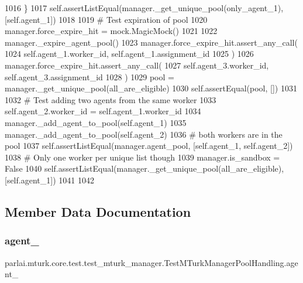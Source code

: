 \begin{DoxyCode}
1016         \}
1017         self.assertListEqual(manager.\_get\_unique\_pool(only\_agent\_1), [self.agent\_1])
1018 
1019         \textcolor{comment}{# Test expiration of pool}
1020         manager.force\_expire\_hit = mock.MagicMock()
1021 
1022         manager.\_expire\_agent\_pool()
1023         manager.force\_expire\_hit.assert\_any\_call(
1024             self.agent\_1.worker\_id, self.agent\_1.assignment\_id
1025         )
1026         manager.force\_expire\_hit.assert\_any\_call(
1027             self.agent\_3.worker\_id, self.agent\_3.assignment\_id
1028         )
1029         pool = manager.\_get\_unique\_pool(all\_are\_eligible)
1030         self.assertEqual(pool, [])
1031 
1032         \textcolor{comment}{# Test adding two agents from the same worker}
1033         self.agent\_2.worker\_id = self.agent\_1.worker\_id
1034         manager.\_add\_agent\_to\_pool(self.agent\_1)
1035         manager.\_add\_agent\_to\_pool(self.agent\_2)
1036         \textcolor{comment}{# both workers are in the pool}
1037         self.assertListEqual(manager.agent\_pool, [self.agent\_1, self.agent\_2])
1038         \textcolor{comment}{# Only one worker per unique list though}
1039         manager.is\_sandbox = \textcolor{keyword}{False}
1040         self.assertListEqual(manager.\_get\_unique\_pool(all\_are\_eligible), [self.agent\_1])
1041 
1042 
\end{DoxyCode}


\subsection{Member Data Documentation}
\mbox{\label{classparlai_1_1mturk_1_1core_1_1test_1_1test__mturk__manager_1_1TestMTurkManagerPoolHandling_a59131f0fadad672f2b28623196b1dc0f}} 
\subsubsection{\texorpdfstring{agent\+\_}{agent\_1}}
{\footnotesize\ttfamily parlai.\+mturk.\+core.\+test.\+test\+\_\+mturk\+\_\+manager.\+Test\+M\+Turk\+Manager\+Pool\+Handling.\+agent\+\_}



